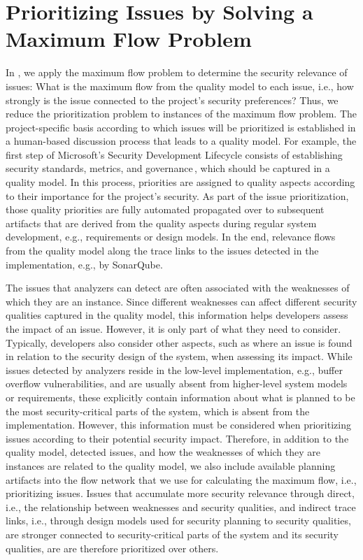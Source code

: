 \section{Prioritizing Issues by Solving a Maximum Flow Problem}
\label{sec:approach}
%
In \appr, we apply the maximum flow problem to determine the security relevance of issues:
What is the maximum flow from the quality model to each issue, i.e., how strongly is the issue connected to the project's security preferences?
Thus, we reduce the prioritization problem to instances of the maximum flow problem.
The project-specific basis according to which issues will be prioritized is established in a human-based discussion process that leads to a quality model.
For example, the first step of Microsoft's Security Development Lifecycle consists of establishing security standards, metrics, and governance\,\cite{howard2006security}, which should be captured in a quality model.
In this process, priorities are assigned to quality aspects according to their importance for the project's security.
As part of the issue prioritization, those quality priorities are fully automated propagated over to subsequent artifacts that are derived from the quality aspects during regular system development, e.g., requirements or design models.
In the end, relevance flows from the quality model along the trace links to the issues detected in the implementation, e.g., by SonarQube.

    The issues that analyzers can detect are often associated with the weaknesses of which they are an instance.
    Since different weaknesses can affect different security qualities captured in the quality model, this information helps developers assess the impact of an issue.
    However, it is only part of what they need to consider.
    Typically, developers also consider other aspects, such as where an issue is found in relation to the security design of the system, when assessing its impact.
	While issues detected by analyzers reside in the low-level implementation, e.g., buffer overflow vulnerabilities, and are usually absent from higher-level system models or requirements, these explicitly contain information about what is planned to be the most security-critical parts of the system, which is absent from the implementation.
	However, this information must be considered when prioritizing issues according to their potential security impact.
	Therefore, in addition to the quality model, detected issues, and how the weaknesses of which they are instances are related to the quality model, we also include available planning artifacts into the flow network that we use for calculating the maximum flow, i.e., prioritizing issues.
	Issues that accumulate more security relevance through direct, i.e., the relationship between weaknesses and security qualities, and indirect trace links, i.e., through design models used for security planning to security qualities, are stronger connected to security-critical parts of the system and its security qualities, are are therefore prioritized over others.

